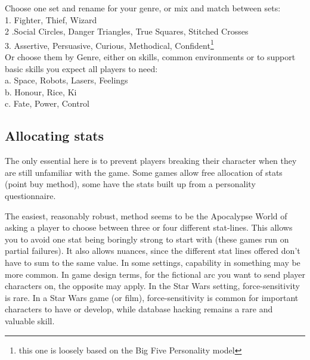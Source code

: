 \documentclass{tufte-handout}
\begin{document}
Choose one set and rename for your genre, or mix and match between sets:\\
1. Fighter, Thief, Wizard\\
2 .Social Circles, Danger Triangles, True Squares, Stitched Crosses \\
3. Assertive, Persuasive, Curious, Methodical, Confident\footnote{this one is loosely based on the Big Five Personality model}\\

Or choose them by Genre, either on skills, common environments or to support basic skills you expect all players to need:\\ 
a. Space, Robots, Lasers,  Feelings\\
b. Honour, Rice, Ki\\
c. Fate, Power, Control \\

\subsection{Allocating stats}

The only essential here is to prevent players breaking their character when they are still unfamiliar with the game. Some games allow free allocation of stats (point buy method), some have the stats built up from a personality questionnaire.

The easiest, reasonably robust, method seems to be the Apocalypse World of asking a player to choose between three or four different stat-lines. This allows you to avoid one stat being boringly strong to start with (these games run on partial failures). It also allows nuances, since the different stat lines offered don't have to sum to the same value. In some settings, capability in something may be more common. In game design terms, for the fictional arc you want to send player characters on, the opposite may apply. In the Star Wars setting, force-sensitivity is rare. In a Star Wars game (or film), force-sensitivity is common for important characters to have or develop, while database hacking remains a rare and valuable skill. 
\end{document}
